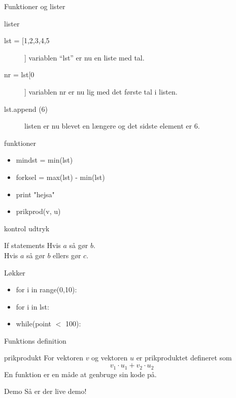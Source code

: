\documentclass[12pt,t]{beamer}
\begin{document}
    \begin{frame}{Funktioner og lister}
        \begin{block}{lister}
            \begin{description}
                \item[lst = [1,2,3,4,5]] variablen ``lst'' er nu en liste med
                tal. \pause
                \item[nr = lst[0]] variablen nr er nu lig med det første tal i
                listen. \pause
                \item[lst.append (6)] listen er nu blevet en længere og det sidste
                element er $6$.
            \end{description}
        \end{block}
        \pause
        \begin{block}{funktioner}
            \begin{itemize}
                \item mindst = min(lst)
            \pause  \item forksel = max(lst) - min(lst)
            \pause  \item print "hejsa"
            \pause  \item prikprod(v, u)
            \end{itemize}
        \end{block}
    \end{frame}


    \begin{frame}[t]{kontrol udtryk}
        \begin{block}{If statements}
            Hvis $a$ så gør $b$. \\
            Hvis $a$ så gør $b$ ellers gør $c$.
        \end{block}
        \begin{block}{Løkker}
            \begin{itemize}
                \item for i in range(0,10):
                \pause \item for i in lst:
                \pause \item while(point $<$ 100):
            \end{itemize}
    \end{block}
    \end{frame}


    \begin{frame}{Funktions definition}
            \begin{block}{prikprodukt}
                For vektoren $v$ og vektoren $u$ er prikproduktet defineret som
                $$
                    v_1 \cdot u_1 + v_2 \cdot u_2
                $$
                En funktion er en måde at genbruge sin kode på.
            \end{block}
                \pause
            \begin{block}{Demo}
                 Så er der live demo!
            \end{block}
    \end{frame}
\end{document}
